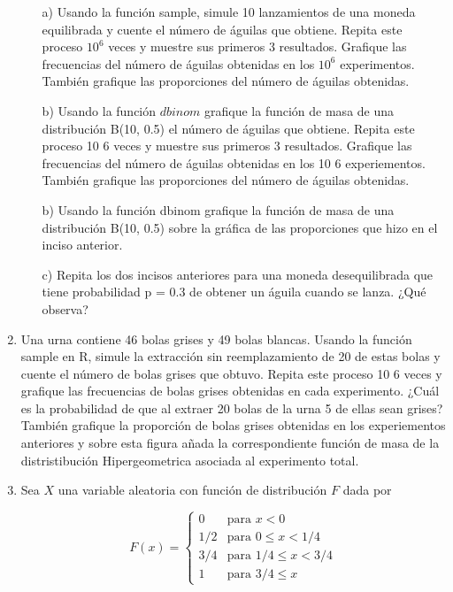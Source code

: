 \documentclass[11pt,letterpaper]{article}
\begin{document}
\begin{enumerate}
\begin{itemize}
\item[a)] Usando la función sample, simule 10 lanzamientos de una moneda equilibrada y cuente el número de águilas que obtiene. Repita este proceso $10^6$ veces y muestre sus primeros 3 resultados. Grafique las frecuencias del número de águilas obtenidas en los $10^6$ experimentos. También grafique las proporciones del número de águilas obtenidas.
\item[b)] Usando la función $dbinom$ grafique la función de masa de una distribución B(10, 0.5) el número de águilas que obtiene. Repita este proceso 10 6 veces y muestre sus primeros 3 resultados. Grafique las frecuencias del número de águilas obtenidas en los 10 6
experiementos. También grafique las proporciones del número de águilas obtenidas.
\item[b)] Usando la función dbinom grafique la función de masa de una distribución B(10, 0.5) sobre la gráfica de las proporciones que hizo en el inciso anterior.
\item[c)] Repita los dos incisos anteriores para una moneda desequilibrada que tiene probabilidad
p = 0.3 de obtener un águila cuando se lanza. ¿Qué observa?
\end{itemize}

\item Una urna contiene 46 bolas grises y 49 bolas blancas. Usando la función sample en R, simule
la extracción sin reemplazamiento de 20 de estas bolas y cuente el número de bolas grises que
obtuvo. Repita este proceso 10 6 veces y grafique las frecuencias de bolas grises obtenidas en
cada experimento. ¿Cuál es la probabilidad de que al extraer 20 bolas de la urna 5 de ellas
sean grises? También grafique la proporción de bolas grises obtenidas en los experiementos anteriores y sobre esta figura añada la correspondiente función de masa de la distristibución Hipergeometrica asociada al experimento total.

\item Sea $X$ una variable aleatoria con función de distribución $F$ dada por

\begin{equation*}
F(x) = \left\{\begin{array}{ll}
0 & \text{para } x<0\\
1/2 & \text{para } 0 \leq x <1/4\\
3/4 & \text{para } 1/4\leq x< 3/4\\
1 & \text{para } 3/4 \leq x
\end{array} \right.
\end{equation*}


\end{enumerate}
\end{document}
